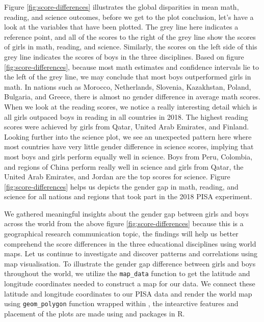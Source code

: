 Figure \ref{fig:score-differences} illustrates the global disparities in
mean math, reading, and science outcomes, before we get to the plot
conclusion, let's have a look at the variables that have been plotted.
The grey line here indicates a reference point, and all of the scores to
the right of the grey line show the scores of girls in math, reading,
and science. Similarly, the scores on the left side of this grey line
indicates the scores of boys in the three disciplines. Based on figure
\ref{fig:score-differences}, because most math estimates and confidence
intervals lie to the left of the grey line, we may conclude that most
boys outperformed girls in math. In nations such as Morocco,
Netherlands, Slovenia, Kazakhstan, Poland, Bulgaria, and Greece, there
is almost no gender difference in average math scores. When we look at
the reading scores, we notice a really interesting detail which is all
girls outpaced boys in reading in all countries in 2018. The highest
reading scores were achieved by girls from Qatar, United Arab Emirates,
and Finland. Looking further into the science plot, we see an unexpected
pattern here where most countries have very little gender difference in
science scores, implying that most boys and girls perform equally well
in science. Boys from Peru, Colombia, and regions of China perform
really well in science and girls from Qatar, the United Arab Emirates,
and Jordan are the top scores for science. Figure
\ref{fig:score-differences} helps us depicts the gender gap in math,
reading, and science for all nations and regions that took part in the
2018 PISA experiment.

We gathered meaningful insights about the gender gap between girls and
boys across the world from the above figure \ref{fig:score-differences}
because this is a geographical research communication topic, the
findings will help us better comprehend the score differences in the
three educational disciplines using world maps. Let us continue to
investigate and discover patterns and correlations using map
visualisation. To illustrate the gender gap difference between girls and
boys throughout the world, we utilize the \texttt{map\_data} function to
get the latitude and longitude coordinates needed to construct a map for
our data. We connect these latitude and longitude coordinates to our
PISA data and render the world map using \texttt{geom\_polygon} function
wrapped within  \citep{ggplot2}, the intearctive
features and placement of the plots are made using 
\citep{plotly} and  \citep{patchwork} packages in R.

